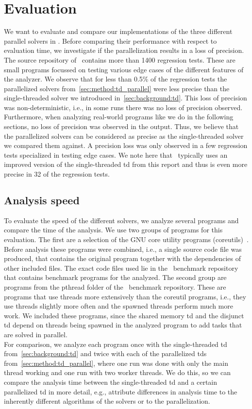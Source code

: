 \section{Evaluation}
\label{sec:eval}
We want to evaluate and compare our implementations of the three different parallel solvers in \gob. Before comparing their performance with respect to evaluation time, we investigate if the parallelization results in a loss of precision.
The source repository of \gob\ contains more than 1400 regression tests. These are small programs focussed on testing various edge cases of the different features of the analyzer. We observe that for less than 0.5\% of the regression tests the parallelized solvers from~\autoref{sec:method:td_parallel} were less precise than the single-threaded solver we introduced in~\autoref{sec:background:td}. This loss of precision was non-deterministic, i.e., in some runs there was no loss of precision observed. Furthermore, when analyzing real-world programs like we do in the following sections, no loss of precision was observed in the output. Thus, we believe that the parallelized solvers can be considered as precise as the single-threaded solver we compared them against. A precision loss was only observed in a few regression tests specialized in testing edge cases. We note here that \gob\ typically uses an improved version of the single-threaded \ac{td} from this report and thus is even more precise in 32 of the regression tests.

  \subsection{Analysis speed}
  \label{sec:eval:speed}
  To evaluate the speed of the different solvers, we analyze several programs and compare the time of the analysis. We use two groups of programs for this evaluation. The first are a selection of the GNU core utility programs (coreutils)~\cite{gnuCoreutils}. Before analysis these programs were combined, i.e., a single source code file was produced, that contains the original program together with the dependencies of other included files. The exact code files used lie in the \gob\ benchmark repository~\cite{goblintBench} that contains benchmark programs for the analyzed.
  The second group are programs from the pthread folder of the \gob\ benchmark repository. These are programs that use threads more extensively than the coreutil programs, i.e., they use threads slightly more often and the spawned threads perform much more work. We included these programs, since the shared memory \ac{td} and the disjunct \ac{td} depend on threads being spawned in the analyzed program to add tasks that are solved in parallel.\\
  For comparison, we analyze each program once with the single-threaded \ac{td} from~\autoref{sec:background:td} and twice with each of the parallelized \acp{td} from~\autoref{sec:method:td_parallel}, where one run was done with only the main thread working and one run with two worker threads. We do this, so we can compare the analysis time between the single-threaded \ac{td} and a certain parallelized \ac{td} in more detail, e.g., attribute differences in analysis time to the inherently different algorithms of the solvers or to the parallelization.

